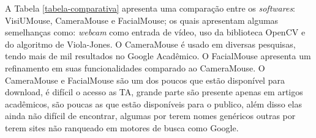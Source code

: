 A Tabela \ref{tabela-comparativa} apresenta uma comparação entre os \textit{softwares}: VisiUMouse, CameraMouse e FacialMouse; os quais apresentam algumas semelhanças como: \textit{webcam} como entrada de vídeo, uso da biblioteca OpenCV e do algoritmo de Viola-Jones. O CameraMouse é usado em diversas pesquisas, tendo mais de mil resultados no Google Acadêmico. O FacialMouse apresenta um refinamento em suas funcionalidades comparado ao CameraMouse. O CameraMouse e FacialMouse são um dos poucos que estão disponível para download, é difícil o acesso as TA, grande parte são presente apenas em artigos acadêmicos, são poucas as que estão disponíveis para o publico, além disso elas ainda não difícil de encontrar, algumas por terem nomes genéricos outras por terem sites não ranqueado em motores de busca como Google.
% 
% 
% 
% 

